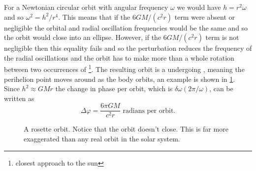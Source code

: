 \documentclass[fleqn]{NotesClass}
\begin{document}
    For a Newtonian circular orbit with angular frequency \(\omega\) we would have \(h = r^2\omega\) and so \(\omega^2 = h^2/r^4\).
    This means that if the \(6GM/(c^2 r)\) term were absent or negligible the orbital and radial oscillation frequencies would be the same and so the orbit would close into an ellipse.
    However, if the \(6GM/(c^2 r)\) term is not negligible then this equality fails and so the perturbation reduces the frequency of the radial oscillations and the orbit has to make more than a whole rotation between two occurrences of \footnote{closest approach to the sun}.
    The resulting orbit is a  undergoing , meaning the perihelion point moves around as the body orbits, an example is shown in \cref{fig:rosette orbit}.
    Since \(h^2 \approx GMr\) the change in phase per orbit, which is \(\delta\omega (2\pi/\omega)\), can be written as
    \begin{equation}
        \Delta\varphi = \frac{6\pi GM}{c^2 r} \text{ radians per orbit}.
    \end{equation}
    
    \begin{figure}
        \caption[Rosette orbit.]{A rosette orbit. Notice that the orbit doesn't close. This is far more exaggerated than any real orbit in the solar system.}
        \label{fig:rosette orbit}
    \end{figure}
    
\end{document}
